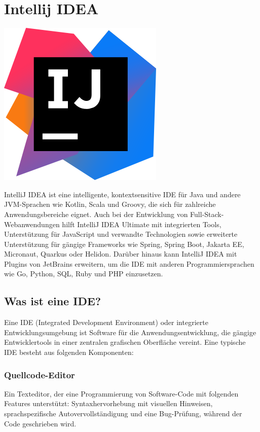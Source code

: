 \section{Intellij IDEA}
\includegraphics[scale=0.05]{pics/logos/intellijIdeaLogo.png}

IntelliJ IDEA ist eine intelligente, kontextsensitive IDE für Java und andere JVM-Sprachen wie Kotlin, Scala und Groovy, die sich für zahlreiche 
Anwendungsbereiche eignet. Auch bei der Entwicklung von Full-Stack-Webanwendungen hilft IntelliJ IDEA Ultimate mit integrierten Tools, 
Unterstützung für JavaScript und verwandte Technologien sowie erweiterte Unterstützung für gängige Frameworks wie Spring, Spring Boot, Jakarta EE, Micronaut, 
Quarkus oder Helidon. Darüber hinaus kann IntelliJ IDEA mit Plugins von JetBrains erweitern, um die IDE mit anderen Programmiersprachen wie 
Go, Python, SQL, Ruby und PHP einzusetzen. 
\cite{sysarch-intellij-1}

\subsection{Was ist eine IDE?}

Eine IDE (Integrated Development Environment) oder integrierte Entwicklungsumgebung ist Software für die Anwendungsentwicklung, 
die gängige Entwicklertools in einer zentralen grafischen Oberfläche vereint. Eine typische IDE besteht aus folgenden Komponenten:
\cite{sysarch-intellij-2}

\subsubsection{Quellcode-Editor }
Ein Texteditor, der eine Programmierung von Software-Code mit folgenden Features unterstützt: 
Syntaxhervorhebung mit visuellen Hinweisen, sprachspezifische Autovervollständigung und eine Bug-Prüfung, während der Code geschrieben wird.
\cite{sysarch-intellij-2}

